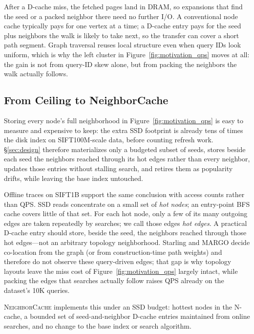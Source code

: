 After a D-cache miss, the fetched pages land in DRAM, so expansions that find the seed or a packed neighbor there need no further I/O.
A conventional node cache typically pays for one vertex at a time; a D-cache entry pays for the seed plus neighbors the walk is likely to take next, so the transfer can cover a short path segment.
Graph traversal reuses local structure even when query IDs look uniform, which is why the left cluster in Figure~\ref{fig:motivation_qps} moves at all: the gain is not from query-ID skew alone, but from packing the neighbors the walk actually follows.

\subsection{From Ceiling to NeighborCache}
Storing every node's full neighborhood in Figure~\ref{fig:motivation_qps} is easy to measure and expensive to keep: the extra SSD footprint is already tens of times the disk index on SIFT100M-scale data, before counting refresh work.
\S\ref{sec:design} therefore materializes only a budgeted subset of seeds, stores beside each seed the neighbors reached through its hot edges rather than every neighbor, updates those entries without stalling search, and retires them as popularity drifts, while leaving the base index untouched.

Offline traces on SIFT1B support the same conclusion with access counts rather than QPS.
SSD reads concentrate on a small set of \emph{hot nodes}; an entry-point BFS cache covers little of that set.
For each hot node, only a few of its many outgoing edges are taken repeatedly by searches; we call those edges \emph{hot edges}.
A practical D-cache entry should store, beside the seed, the neighbors reached through those hot edges---not an arbitrary topology neighborhood.
Starling and MARGO decide co-location from the graph (or from construction-time path weights) and therefore do not observe these query-driven edges; that gap is why topology layouts leave the miss cost of Figure~\ref{fig:motivation_qps} largely intact, while packing the edges that searches actually follow raises QPS already on the dataset's 10K queries.

\textsc{NeighborCache} implements this under an SSD budget: hottest nodes in the N-cache, a bounded set of seed-and-neighbor D-cache entries maintained from online searches, and no change to the base index or search algorithm.
